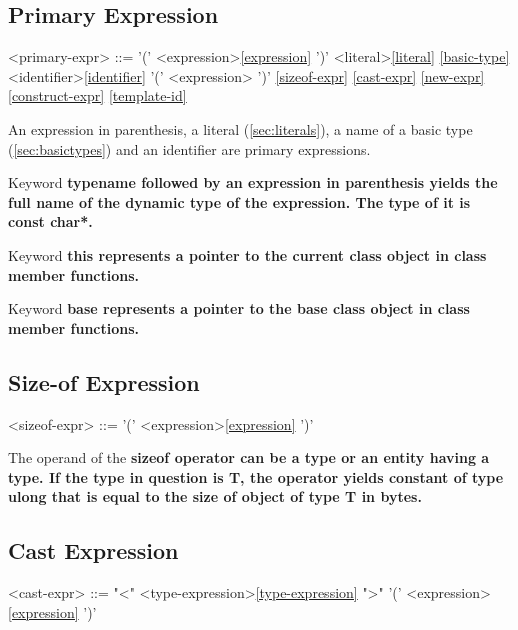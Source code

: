 \documentclass[a4paper,oneside,11pt]{article}
\begin{document}
\subsection{Primary Expression}

\begin{grammar}
\label{primary-expr}<primary-expr> ::= '(' <expression>\ref{expression} ')'
\alt <literal>\ref{literal}
\ref{basic-type}
\alt <identifier>\ref{identifier}
\alt {} '(' <expression> ')'
\alt {}
\alt {}
\ref{sizeof-expr}
\ref{cast-expr}
\ref{new-expr}
\ref{construct-expr}
\ref{template-id}
\end{grammar}

An expression in parenthesis, a literal (\ref{sec:literals}), a name of a basic type (\ref{sec:basictypes}) and an identifier are primary expressions.

Keyword \bf{typename} followed by an expression in parenthesis yields the full name of the dynamic type of the expression.
The type of it is \bf{const char*}.

Keyword \bf{this} represents a pointer to the current class object in class member functions.

Keyword \bf{base} represents a pointer to the base class object in class member functions.

\subsection{Size-of Expression}

\begin{grammar}
\label{sizeof-expr}<sizeof-expr> ::=  '(' <expression>\ref{expression} ')'
\end{grammar}

The operand of the \bf{sizeof} operator can be a type or an entity having a type.
If the type in question is T, the operator yields constant of type \bf{ulong} that is equal to the size of object of type T in bytes.

\subsection{Cast Expression}\label{sec:castexpression}

\begin{grammar}
\label{cast-expr}<cast-expr> ::=  "<" <type-expression>\ref{type-expression} ">" '(' <expression>\ref{expression} ')'
\end{grammar}
\end{document}
